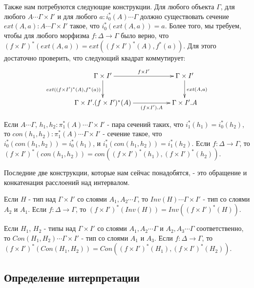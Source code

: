 \documentclass{amsart}
\theoremstyle{definition}
\theoremstyle{remark}
\numberwithin{figure}{section}
\begin{document}
Также нам потребуются следующие конструкции.
Для любого объекта $\Gamma$, для любого $A \dotsb \Gamma \times I'$ и для любого $a : i_0^*(A) \dotsb \Gamma$ должно существовать сечение $ext(A,a) : A \dotsb \Gamma \times I'$ такое, что $i_0^*(ext(A,a)) = a$.
Более того, мы требуем, чтобы для любого морфизма $f : \Delta \to \Gamma$ было верно, что $(f \times I')^*(ext(A,a)) = ext((f \times I')^*(A), f^*(a))$.
Для этого достаточно проверить, что следующий квадрат коммутирует:
\[ \xymatrix{ \Gamma \times I' \ar[rr]^{f \times I'} \ar[d]_{ext((f \times I')^*(A), f^*(a))} & & \Gamma \times I' \ar[d]^{ext(A,a)} \\
              \Gamma \times I'.(f \times I')^*(A) \ar[rr]_-{(f \times I').A}                  & & \Gamma \times I'.A
            } \]

Если $A \dotsb \Gamma$, $h_1, h_2 : \pi_1^*(A) \dotsb \Gamma \times I'$ - пара сечений таких, что $i_1^*(h_1) = i_0^*(h_2)$, то $con(h_1, h_2) : \pi_1^*(A) \dotsb \Gamma \times I'$ - сечение такое, что $i_0^*(con(h_1, h_2)) = i_0^*(h_1)$, и $i_1^*(con(h_1, h_2)) = i_1^*(h_2)$.
Если $f : \Delta \to \Gamma$, то $(f \times I')^*(con(h_1, h_2)) = con((f \times I')^*(h_1), (f \times I')^*(h_2))$.

Последние две конструкции, которые нам сейчас понадобятся, - это обращение и конкатенация расслоений над интервалом.

Если $H$ - тип над $\Gamma \times I'$ со слоями $A_1, A_2 \dotsb \Gamma$, то $Inv(H) \dotsb \Gamma \times I'$ - тип со слоями $A_2$ и $A_1$.
Если $f : \Delta \to \Gamma$, то $(f \times I')^*(Inv(H)) = Inv((f \times I')^*(H))$.

Если $H_1$, $H_2$ - типы над $\Gamma \times I'$ со слоями $A_1, A_2 \dotsb \Gamma$ и $A_2, A_3 \dotsb \Gamma$ соответственно, то $Con(H_1, H_2) \dotsb \Gamma \times I'$ - тип со слоями $A_1$ и $A_3$.
Если $f : \Delta \to \Gamma$, то $(f \times I')^*(Con(H_1, H_2)) = Con((f \times I')^*(H_1), (f \times I')^*(H_2))$.

\subsection{Определение интерпретации}
\end{document}
